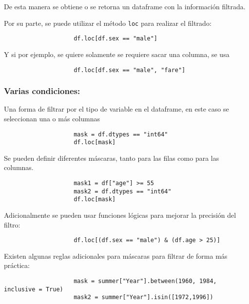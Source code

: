                De esta manera se obtiene o se retorna un dataframe con la información filtrada.

                Por su parte, se puede utilizar el método \texttt{loc} para realizar el filtrado:

                \begin{verbatim}
                    df.loc[df.sex == "male"]    
                \end{verbatim}

                Y si por ejemplo, se quiere solamente se requiere sacar una columna, se usa
                \begin{verbatim}
                    df.loc[df.sex == "male", "fare"]    
                \end{verbatim}

            \subsubsection{Varias condiciones:}


                Una forma de filtrar por el tipo de variable en el dataframe, en este caso se seleccionan una o más columnas

                \begin{verbatim}
                    mask = df.dtypes == "int64"
                    df.loc[mask]    
                \end{verbatim}

                Se pueden definir diferentes máscaras, tanto para las filas como para las columnas.

                \begin{verbatim}
                    mask1 = df["age"] >= 55
                    mask2 = df.dtypes == "int64"
                    df.loc[mask]    
                \end{verbatim}

                Adicionalmente se pueden usar funciones lógicas para mejorar la precisión del filtro:
                \begin{verbatim}
                    df.loc[(df.sex == "male") & (df.age > 25)]    
                \end{verbatim}

                Existen algunas reglas adicionales para máscaras para filtrar de forma más práctica:

                \begin{verbatim}
                    mask = summer["Year"].between(1960, 1984, inclusive = True)
                    mask2 = summer["Year"].isin([1972,1996])
                \end{verbatim}

